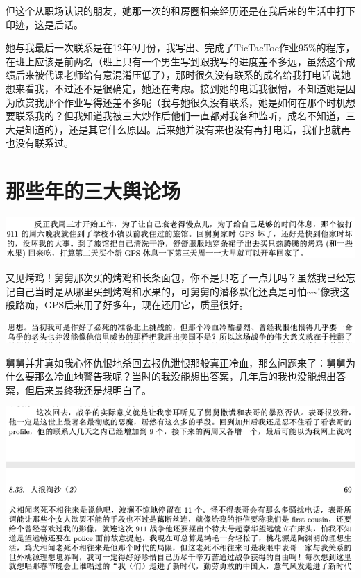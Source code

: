 \documentclass[9pt, b5paper]{article}
\begin{document}
但这个从职场认识的朋友，她那一次的租房圈相亲经历还是在我后来的生活中打下印迹，这是后话。 

她与我最后一次联系是在12年9月份，我写出、完成了TicTacToe作业95\%的程序，在班上应该是前两名（班上只有一个男生写到跟我写的进度差不多远，虽然这个成绩后来被代课老师给有意混淆压低了），那时很久没有联系的成名给我打电话说她想来看我，不过还不是很确定，她还在考虑。接到她的电话我很懵，不知道她是因为欣赏我那个作业写得还差不多呢（我与她很久没有联系，她是如何在那个时机想要联系我的？但我知道我被三大炒作后他们一直都对我各种监听，成名不知道，三大是知道的），还是其它什么原因。后来她并没有来也没有再打电话，我们也就再也没有联系过。 

\section{那些年的三大舆论场}
\label{sec:org27095f8}

\begin{center}
\includegraphics[width=.9\linewidth]{./pic/p1p68-0.png}
\end{center}

又见烤鸡！舅舅那次买的烤鸡和长条面包，你不是只吃了一点儿吗？虽然我已经忘记自己当时是从哪里买到烤鸡和水果的，可舅舅的潜移默化还真是可怕\textasciitilde{}\textasciitilde{}!像我这般路痴，GPS后来用了好多年，现在还用它，质量很好。 

\begin{center}
\includegraphics[width=.9\linewidth]{./pic/p1p68-1.png}
\end{center}

舅舅并非真如我心怀仇恨地杀回去报仇泄恨那般真正冷血，那么问题来了：舅舅为什么要那么冷血地警告我呢？当时的我没能想出答案，几年后的我也没能想出答案，但后来最终我还是想明白了。

\begin{center}
\includegraphics[width=.9\linewidth]{./pic/p1p69.png}
\end{center}
\end{document}
